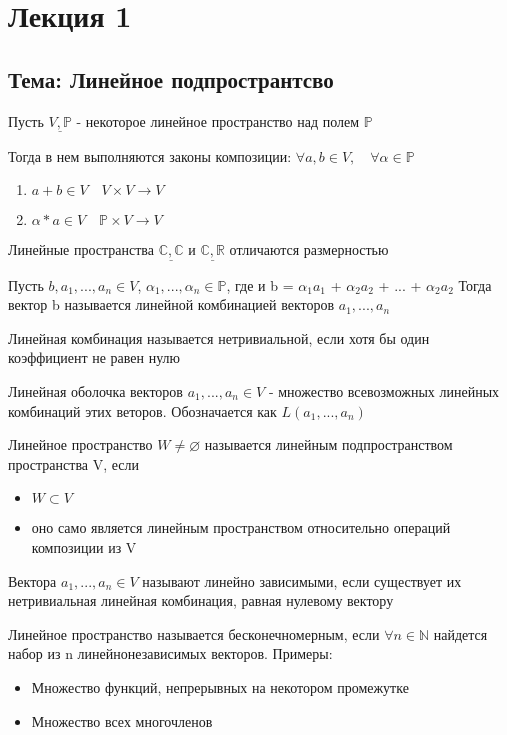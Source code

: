 \documentclass[l1pt]{article}
\begin{document}
\section*{Лекция 1}
\date{May 2017}
\subsection*{Тема: Линейное подпространтсво}
\begin{flushleft}
Пусть $\underline{V,  \mathbb{P}}$ - некоторое линейное пространство над полем $\mathbb{P}$

Тогда в нем выполняются законы композиции:
$\forall a, b \in V, \quad \forall \alpha \in \mathbb{P}$
\begin{enumerate}
 \item $a + b \in V \quad V \times V \rightarrow V$
 \item $\alpha * a \in V \quad \mathbb{P} \times V \rightarrow V$
\end{enumerate}


Линейные пространства $\underline{\mathbb{C}, \mathbb{C}}$ и $\underline{\mathbb{C}, \mathbb{R}}$ отличаются размерностью\newline

Пусть $b, a_1, ... , a_n \in V$, $\alpha_1, ... , \alpha_n \in \mathbb{P}$, где и b = $\alpha_1 a_1$ + $\alpha_2 a_2$ + ... + $\alpha_2 a_2$
Тогда вектор b называется линейной комбинацией векторов $a_1, ... , a_n$\newline

Линейная комбинация называется нетривиальной, если хотя бы один коэффициент не равен нулю

Линейная оболочка векторов $a_1, ... , a_n \in V$ - множество всевозможных линейных комбинаций этих веторов. Обозначается как $L(a_1, ... , a_n)$

Линейное пространство $W \neq \varnothing$ называется линейным подпространством пространства V, если
\begin{itemize}
 \item $W \subset V$
 \item оно само является линейным пространством относительно операций композиции из V 
\end{itemize}

Вектора $a_1, ... , a_n \in V$ называют линейно зависимыми, если существует их нетривиальная линейная комбинация, равная нулевому вектору\newline

Линейное пространство называется бесконечномерным, если $\forall n \in \mathbb{N}$ найдется набор из n линейнонезависимых векторов. 
Примеры:
\begin{itemize}
 \item Множество функций, непрерывных на некотором промежутке
 \item Множество всех многочленов 
\end{itemize}


\end{flushleft}
\end{document}
